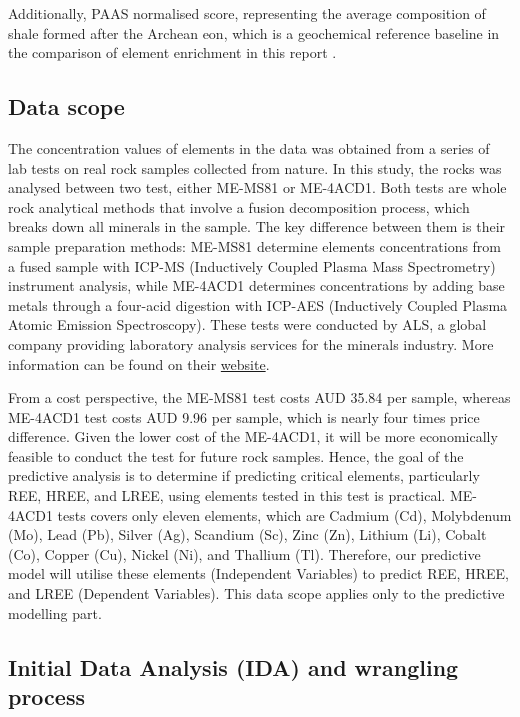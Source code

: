 \documentclass[11pt,a4paper,]{article}
\begin{document}
Additionally, PAAS normalised score, representing the average composition of shale formed after the Archean eon, which is a geochemical reference baseline in the comparison of element enrichment in this report \autocite{McLennan2011}.

\subsection{Data scope}\label{data-scope}

The concentration values of elements in the data was obtained from a series of lab tests on real rock samples collected from nature. In this study, the rocks was analysed between two test, either ME-MS81 or ME-4ACD1. Both tests are whole rock analytical methods that involve a fusion decomposition process, which breaks down all minerals in the sample. The key difference between them is their sample preparation methods: ME-MS81 determine elements concentrations from a fused sample with ICP-MS (Inductively Coupled Plasma Mass Spectrometry) instrument analysis, while ME-4ACD1 determines concentrations by adding base metals through a four-acid digestion with ICP-AES (Inductively Coupled Plasma Atomic Emission Spectroscopy). These tests were conducted by ALS, a global company providing laboratory analysis services for the minerals industry. More information can be found on their \href{https://www.alsglobal.com/en/geochemistry}{website}.

From a cost perspective, the ME-MS81 test costs AUD 35.84 per sample, whereas ME-4ACD1 test costs AUD 9.96 per sample, which is nearly four times price difference. Given the lower cost of the ME-4ACD1, it will be more economically feasible to conduct the test for future rock samples. Hence, the goal of the predictive analysis is to determine if predicting critical elements, particularly REE, HREE, and LREE, using elements tested in this test is practical. ME-4ACD1 tests covers only eleven elements, which are Cadmium (Cd), Molybdenum (Mo), Lead (Pb), Silver (Ag), Scandium (Sc), Zinc (Zn), Lithium (Li), Cobalt (Co), Copper (Cu), Nickel (Ni), and Thallium (Tl). Therefore, our predictive model will utilise these elements (Independent Variables) to predict REE, HREE, and LREE (Dependent Variables). This data scope applies only to the predictive modelling part.

\subsection{Initial Data Analysis (IDA) and wrangling process}\label{initial-data-analysis-ida-and-wrangling-process}
\end{document}
